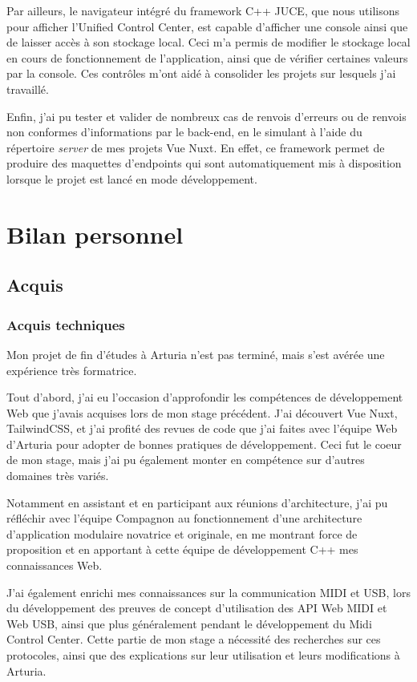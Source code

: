 \documentclass[francais]{rapportPFE}  %
\begin{document}
Par ailleurs, le navigateur intégré du framework C++ JUCE, que nous utilisons pour afficher l'Unified Control Center, est capable d'afficher une console ainsi que de laisser accès à son stockage local. Ceci m'a permis de modifier le stockage local en cours de fonctionnement de l'application, ainsi que de vérifier certaines valeurs par la console. Ces contrôles m'ont aidé à consolider les projets sur lesquels j'ai travaillé.

Enfin, j'ai pu tester et valider de nombreux cas de renvois d'erreurs ou de renvois non conformes d'informations par le back-end, en le simulant à l'aide du répertoire \textit{server} de mes projets Vue Nuxt. En effet, ce framework permet de produire des maquettes d'endpoints qui sont automatiquement mis à disposition lorsque le projet est lancé en mode développement.

\section{Bilan personnel}
\subsection{Acquis}
\subsubsection{Acquis techniques}

Mon projet de fin d'études à Arturia n'est pas terminé, mais s'est avérée une expérience très formatrice. 

Tout d'abord, j'ai eu l'occasion d'approfondir les compétences de développement Web que j'avais acquises lors de mon stage précédent. J'ai découvert Vue Nuxt, TailwindCSS, et j'ai profité des revues de code que j'ai faites avec l'équipe Web d'Arturia pour adopter de bonnes pratiques de développement. Ceci fut le coeur de mon stage, mais j'ai pu également monter en compétence sur d'autres domaines très variés. 

Notamment en assistant et en participant aux réunions d'architecture, j'ai pu réfléchir avec l'équipe Compagnon au fonctionnement d'une architecture d'application modulaire novatrice et originale, en me montrant force de proposition et en apportant à cette équipe de développement C++ mes connaissances Web. 

J'ai également enrichi mes connaissances sur la communication MIDI et USB, lors du développement des preuves de concept d'utilisation des API Web MIDI et Web USB, ainsi que plus généralement pendant le développement du Midi Control Center. Cette partie de mon stage a nécessité des recherches sur ces protocoles, ainsi que des explications sur leur utilisation et leurs modifications à Arturia. 
\end{document}
